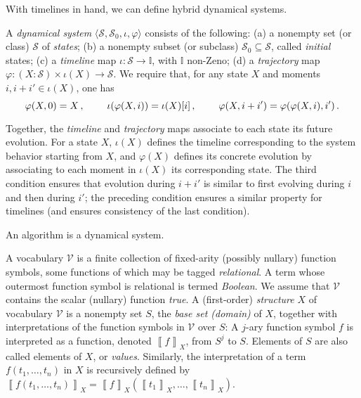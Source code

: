 \documentclass[envcountsame]{llncs}
\newcommand{\St}{\ensuremath{\mathcal {S}}}
\newcommand{\I}{\ensuremath{\mathbb{I}}}
\newcommand{\In}{\St_0}
\newcommand{\U}{\ensuremath{\mathcal {V}}}
\newcommand{\evaluation}[2][]{\ensuremath{\left\llbracket #2\right\rrbracket_{#1}}}
\newcommand{\val}[2]{\evaluation[#2]{#1}}
\newcommand{\itm}[1]{\mbox{\rm(}#1\mbox{\rm)}}
\begin{document}
With timelines in hand, we can define hybrid dynamical systems.

\begin{definition}\label{LTS} \label{def:ts}
A \emph{dynamical  system} $\langle \St, \In, \iota, \varphi \rangle$
consists of the following:
\itm{a} a nonempty set (or class)
$\St$ of \emph{states};
\itm{b} a nonempty subset (or subclass) $\In \subseteq \St$, called \emph{initial} states;
\itm{c} a \emph{timeline} map $\iota : \St \to \I$, with $\I$ non-Zeno;
\itm{d} a \emph{trajectory} map $\varphi: (X : \St) \times \iota(X) \to \St$.
We require that,
for any state $X$ and moments $i, i+i' \in \iota(X)$, one has
$$\varphi(X,0) = X\,, \hspace*{8mm}
\iota(\varphi(X,i)) = \iota(X)[i]\,, \hspace*{8mm}
\varphi(X,i+i') = \varphi(\varphi(X,i),i')\,.
$$
\end{definition}

Together, the \emph{timeline} and \emph{trajectory} maps associate to each state its future
evolution. For a state $X$, $\iota(X)$ defines the timeline corresponding to the system behavior
starting from $X$, and $\varphi(X)$ defines its concrete evolution by associating to each moment in
$\iota(X)$ its corresponding state. The third condition ensures that evolution during $i+i'$ is similar to
first evolving during $i$ and then during $i'$; the preceding condition ensures a similar
property for timelines (and ensures  consistency of the last condition).

\begin{postulatep} An algorithm is a dynamical system.
\end{postulatep}





A vocabulary $\U$ is a finite collection of fixed-arity (possibly
nullary)  function
symbols,
 some functions of which may be tagged \emph{relational}.  A term whose
 outermost function symbol is relational is termed \emph{Boolean}. We
 assume that $\U$ contains the scalar (nullary) function \textit{true}.
A (first-order) \emph{structure} $X$ of vocabulary $\U$ is a nonempty set $S$, the
\emph{base set (domain)} of $X$, together with interpretations of the function
symbols in $\U$ over $S$: A $j$-ary function  symbol $f$ is interpreted as a function,
denoted  $\val{f}{X}$, from $S^j$ to $S$.  Elements of $S$ are also called elements of
$X$, or \emph{values}. Similarly, the interpretation of a term $f(t_1,\dots ,t_n)$ in $X$
is recursively defined by $\val{f(t_1,\dots ,t_n)}{X} = \val{f}{X}(\val{t_1}{X},\dots ,\val{t_n}{X})$.
\end{document}
